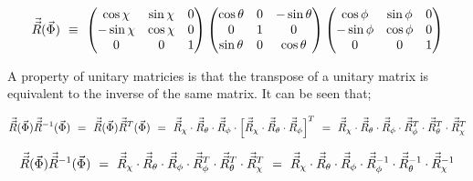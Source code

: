 \documentclass{ece}
\begin{document}
\begin{equation}
\vec{\vec{R}} ( \vec{\Phi} ) \hspace{0.125cm} \equiv \hspace{0.125cm} 
\begin{pmatrix}
\cos{\chi} & \sin{\chi} & 0 \\
-\sin{\chi} & \cos{\chi} & 0 \\
0 & 0 & 1 
\end{pmatrix}
\begin{pmatrix}
\cos{\theta} & 0 & -\sin{\theta} \\
0 & 1 & 0 \\
\sin{\theta} & 0 & \cos{\theta}
\end{pmatrix}
\begin{pmatrix}
\cos{\phi} & \sin{\phi} & 0 \\
-\sin{\phi} & \cos{\phi} & 0 \\
0 & 0 & 1 
\end{pmatrix}
\end{equation}

A property of unitary matricies is that the transpose of a unitary matrix is equivalent to the inverse of the same matrix. It can be seen that;

\begin{equation}
    \vec{\vec{R}} ( \vec{\Phi} )  \vec{\vec{R}}^{-1} ( \vec{\Phi} ) \hspace{0.125cm} = \hspace{0.125cm}
    \vec{\vec{R}} ( \vec{\Phi} )  \vec{\vec{R}}^{T} ( \vec{\Phi} ) \hspace{0.125cm} = \hspace{0.125cm}  \vec{\vec{R}}_{\chi} \cdot \vec{\vec{R}}_{\theta} \cdot \vec{\vec{R}}_{\phi} \cdot \Big[ \vec{\vec{R}}_{\chi} \cdot \vec{\vec{R}}_{\theta} \cdot \vec{\vec{R}}_{\phi} \Big]^{T} \hspace{0.125cm} = \hspace{0.125cm} \vec{\vec{R}}_{\chi} \cdot \vec{\vec{R}}_{\theta} \cdot \vec{\vec{R}}_{\phi} \cdot \vec{\vec{R}}_{\phi}^{T} \cdot \vec{\vec{R}}_{\theta}^{T} \cdot \vec{\vec{R}}_{\chi}^{T} 
\end{equation}

\begin{equation}
    \vec{\vec{R}} ( \vec{\Phi} )  \vec{\vec{R}}^{-1} ( \vec{\Phi} ) \hspace{0.125cm} = \hspace{0.125cm} \vec{\vec{R}}_{\chi} \cdot \vec{\vec{R}}_{\theta} \cdot \vec{\vec{R}}_{\phi} \cdot
    \vec{\vec{R}}_{\phi}^{T} \cdot \vec{\vec{R}}_{\theta}^{T} \cdot \vec{\vec{R}}_{\chi}^{T} \hspace{0.125cm} = \hspace{0.125cm} \vec{\vec{R}}_{\chi} \cdot \vec{\vec{R}}_{\theta} \cdot \vec{\vec{R}}_{\phi} \cdot \vec{\vec{R}}_{\phi}^{-1} \cdot \vec{\vec{R}}_{\theta}^{-1} \cdot \vec{\vec{R}}_{\chi}^{-1} 
\end{equation}
\end{document}
